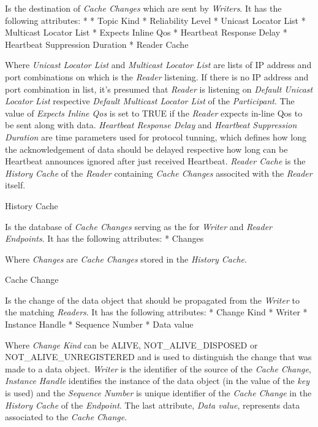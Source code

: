 Is the destination of {\em Cache Changes} which are sent by {\em Writers}. It has the following attributes:
\begitems
* 
* Topic Kind
* Reliability Level
* Unicast Locator List
* Multicast Locator List
* Expects Inline Qos
* Heartbeat Response Delay
* Heartbeat Suppression Duration
* Reader Cache
\enditems

Where {\em Unicast Locator List} and {\em Multicast Locator List} are lists of IP address and port combinations on which is the {\em Reader} listening. If there is no IP address and port combination in list, it's presumed that {\em Reader} is listening on {\em Default Unicast Locator List} respective {\em Default Multicast Locator List} of the {\em Participant}. The value of {\em Expects Inline Qos} is set to TRUE if the {\em Reader} expects in-line Qos to be sent along with data. {\em Heartbeat Response Delay} and {\em Heartbeat Suppression Duration} are time parameters used for protocol tunning, which defines how long the acknowledgement of data should be delayed respective how long can be Heartbeat announces ignored after just received Heartbeat. {\em Reader Cache} is the {\em History Cache} of the {\em Reader} containing {\em Cache Changes} associted with the {\em Reader} itself.

\secc History Cache

Is the database of {\em Cache Changes} serving as the  for {\em Writer} and {\em Reader} {\em Endpoints}. It has the following attributes:
\begitems
* Changes
\enditems

Where {\em Changes} are {\em Cache Changes} stored in the {\em History Cache}.

\secc Cache Change

Is the change of the data object that should be propagated from the {\em Writer} to the matching {\em Readers}. It has the following attributes:
\begitems
* Change Kind
* Writer 
* Instance Handle
* Sequence Number
* Data value
\enditems

Where {\em Change Kind} can be ALIVE, NOT\_ALIVE\_DISPOSED or NOT\_ALIVE\_UNREGISTERED and is used to distinguish the change that was made to a data object. {\em Writer } is the identifier of the source of the {\em Cache Change}, {\em Instance Handle} identifies the instance of the data object (in  the value of the {\em key} is used) and the {\em Sequence Number} is unique identifier of the {\em Cache Change} in the {\em History Cache} of the {\em Endpoint}. The last attribute, {\em Data value}, represents data associated to the {\em Cache Change}.

